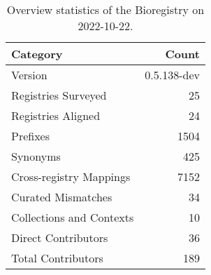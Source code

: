 \begin{table}
\centering
\caption{Overview statistics of the Bioregistry on 2022-10-22.}
\label{tab:bioregistry-summary}
\begin{tabular}{lr}
\toprule
                Category &       Count \\
\midrule
                 Version & 0.5.138-dev \\
     Registries Surveyed &          25 \\
      Registries Aligned &          24 \\
                Prefixes &        1504 \\
                Synonyms &         425 \\
 Cross-registry Mappings &        7152 \\
      Curated Mismatches &          34 \\
Collections and Contexts &          10 \\
     Direct Contributors &          36 \\
      Total Contributors &         189 \\
\bottomrule
\end{tabular}
\end{table}
